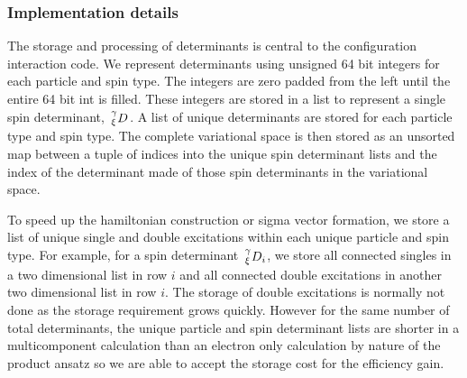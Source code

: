 \subsubsection{Implementation details}
The storage and processing of determinants is central to the configuration interaction code.
We represent determinants using unsigned 64 bit integers for each particle and spin type.
The integers are zero padded from the left until the entire 64 bit int is filled. These integers are stored in a list to represent a single spin determinant, $\shivten{\gamma}{\xi}{D}{}{}$.
A list of unique determinants are stored for each particle type and spin type.
The complete variational space is then stored as an unsorted map between a tuple of indices into the unique spin determinant lists and the index of the determinant made of those spin determinants in the variational space.

To speed up the hamiltonian construction or sigma vector formation, we store a list of unique single and double excitations within each unique particle and spin type.
For example, for a spin determinant $\shivten{\gamma}{\xi}{D}{}{i}$, we store all connected singles in a two dimensional list in row $i$ and all connected double excitations in another two dimensional list in row $i$.
The storage of double excitations is normally not done as the storage requirement grows quickly.
However for the same number of total determinants, the unique particle and spin determinant lists are shorter in a multicomponent calculation than an electron only calculation by nature of the product ansatz so we are able to accept the storage cost for the efficiency gain.

